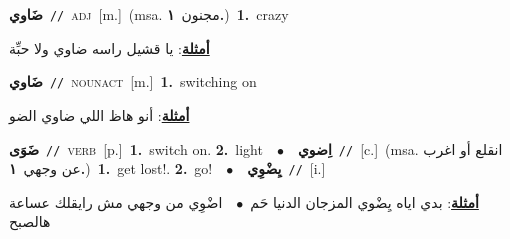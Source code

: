 \documentclass[10pt,a4paper,twoside]{article} %
\begin{document}
\begin{multicols}{2}
{\setlength\topsep{0pt}\textbf{\foreignlanguage{arabic}{ضَاوي}}\ {\color{gray}\texttt{//}\color{black}}\ \textsc{adj}\ [m.]\ \color{gray}(msa. \foreignlanguage{arabic}{مجنون}~\foreignlanguage{arabic}{\textbf{١.}})\color{black}\ \textbf{1.}~crazy\  \begin{flushright}\color{gray}\foreignlanguage{arabic}{\textbf{\underline{\foreignlanguage{arabic}{أمثلة}}}: يا قشيل راسه ضاوي ولا حبِّة}\end{flushright}\color{black}} \vspace{2mm}

{\setlength\topsep{0pt}\textbf{\foreignlanguage{arabic}{ضَاوي}}\ {\color{gray}\texttt{//}\color{black}}\ \textsc{noun\textunderscore act}\ [m.]\ \textbf{1.}~switching on\  \begin{flushright}\color{gray}\foreignlanguage{arabic}{\textbf{\underline{\foreignlanguage{arabic}{أمثلة}}}: أنو هاظ اللي ضاوي الضو}\end{flushright}\color{black}} \vspace{2mm}

{\setlength\topsep{0pt}\textbf{\foreignlanguage{arabic}{ضَوَى}}\ {\color{gray}\texttt{//}\color{black}}\ \textsc{verb}\ [p.]\ \textbf{1.}~switch on.  \textbf{2.}~light\ \ $\bullet$\ \ \setlength\topsep{0pt}\textbf{\foreignlanguage{arabic}{اِضوي}}\ {\color{gray}\texttt{//}\color{black}}\ [c.]\ \color{gray}(msa. \foreignlanguage{arabic}{انقلع أو اغرب عن وجهي}~\foreignlanguage{arabic}{\textbf{١.}})\color{black}\ \textbf{1.}~get lost!.  \textbf{2.}~go!\ \ $\bullet$\ \ \setlength\topsep{0pt}\textbf{\foreignlanguage{arabic}{يِضْوِي}}\ {\color{gray}\texttt{//}\color{black}}\ [i.]\  \begin{flushright}\color{gray}\foreignlanguage{arabic}{\textbf{\underline{\foreignlanguage{arabic}{أمثلة}}}: بدي اياه يِضْوي المزجان الدنيا حَم\ $\bullet$\ \  اضْوِي من وجهي مش رايقلك عساعة هالصبح}\end{flushright}\color{black}} \vspace{2mm}


\end{multicols}
\end{document}
